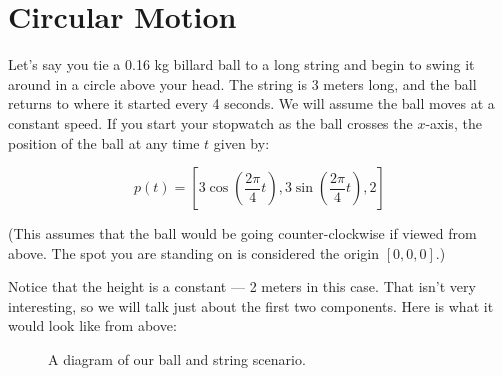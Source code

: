 \chapter{Circular Motion}
Let's say you tie a 0.16 kg billard ball to a long string and begin to swing
it around in a circle above your head. The string is 3
meters long, and the ball returns to where it started every 4
seconds. We will assume the ball moves at a constant speed. If you start your stopwatch as the ball crosses the
$x$-axis, the position of the ball at any time $t$ given by:

$$p(t) = [3 \cos{\left( \frac{2 \pi} {4}t\right)}, 3 \sin{ \left( \frac{2 \pi}{4}t\right) }, 2]$$

(This assumes that the ball would be going counter-clockwise if viewed
from above. The spot you are standing on is considered the origin $[0, 0, 0]$.)

Notice that the height is a constant --- 2 meters in this
case. That isn't very interesting, so we will talk just about the
first two components.  Here is what it would look like from above:


\begin{figure}[htbp]
    \begin{center}
        
    \end{center}
        \caption{A diagram of our ball and string scenario.}
    \label{fig:billiardBall}
\end{figure}

